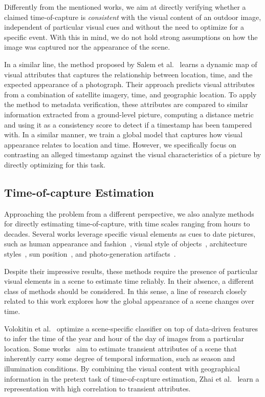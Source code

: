 \documentclass[journal]{IEEEtran}
\begin{document}
        Differently from the mentioned works, we aim at directly verifying whether a claimed time-of-capture is \emph{consistent} with the visual content of an outdoor image, independent of particular visual cues and without the need to optimize for a specific event. With this in mind, we do not hold strong assumptions on how the image was captured nor the appearance of the scene.   
        
        In a similar line, the method proposed by Salem et al.~\cite{salem2020learning} learns a dynamic map of visual attributes that captures the relationship between location, time, and the expected appearance of a photograph. Their approach predicts visual attributes from a combination of satellite imagery, time, and geographic location. To apply the method to metadata verification, these attributes are compared to similar information extracted from a ground-level picture, computing a distance metric and using it as a consistency score to detect if a timestamp has been tampered with. In a similar manner, we train a global model that captures how visual appearance relates to location and time. However, we specifically focus on contrasting an alleged timestamp against the visual characteristics of a picture by directly optimizing for this task.

    \subsection{Time-of-capture Estimation}
        Approaching the problem from a different perspective, we also analyze methods for directly estimating time-of-capture, with time scales ranging from hours to decades. Several works leverage specific visual elements as cues to date pictures, such as human appearance and fashion~\cite{ginosar2015century, salem2016analyzing}, visual style of objects~\cite{jae2013style, vittayakorn2017made}, architecture styles~\cite{linking2015iccp}, sun position~\cite{kakar2012verifying, li2017you, tsai2016photo}, and photo-generation artifacts~\cite{fernando2014color, martin2014dating, palermo2012dating}.
        
        Despite their impressive results, these methods require the presence of particular visual elements in a scene to estimate time reliably. In their absence, a different class of methods should be considered. In this sense, a line of research closely related to this work explores how the global appearance of a scene changes over time. 
        
        Volokitin et al.~\cite{volokitin2016deep} optimize a scene-specific classifier on top of data-driven features to infer the time of the year and hour of the day of images from a particular location. Some works~\cite{baltenberger16transient, laffont2014transient} aim to estimate transient attributes of a scene that inherently carry some degree of temporal information, such as season and illumination conditions. By combining the visual content with geographical information in the pretext task of time-of-capture estimation, Zhai et al.~\cite{zhai2018geotemporal} learn a representation with high correlation to transient attributes.
        
\end{document}
